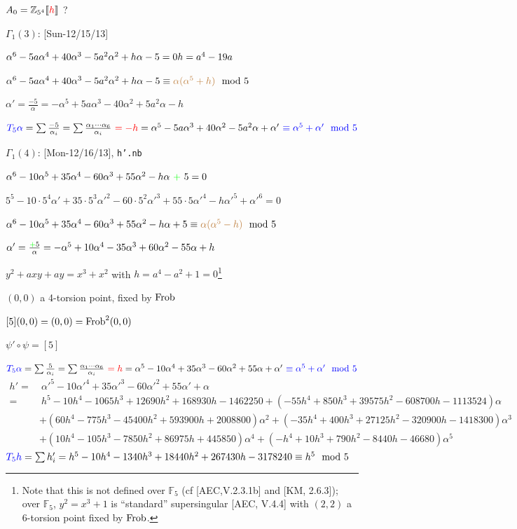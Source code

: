 \documentclass{rs}
\theoremstyle{definition}
\theoremstyle{remark}
\newcommand{\mb}[1]{\mathbb{#1}}
\newcommand{\Frob}{{\rm Frob}}
\newcommand{\BF}{{\mb F}}
\newcommand{\BZ}{{\mb Z}}
\newcommand{\md}{~~{\rm mod}~}
\newcommand{\A}{\alpha}
\newcommand{\G}{\Gamma}
\newcommand{\lb}{\llbracket}
\newcommand{\rb}{\rrbracket}
\renewcommand{\=}{\approx}
\renewcommand{\-}{\sim}
\numberwithin{equation}{section}
\numberwithin{thm}{section}
\begin{document}
$A_0 = \BZ_{5^4} \lb \textcolor{red}{h} \rb$ ?  

$\G_1(3)$: \hfill [Sun-12/15/13] 

$\A^6 - 5 a \A^4 + 40 \A^3 - 5 a^2 \A^2 + h \A - 5 = 0 \hfill h = a^4 - 19 a$ 

$\A^6 - 5 a \A^4 + 40 \A^3 - 5 a^2 \A^2 + h \A - 5 \equiv \textcolor{brown}{\A (\A^5 + h)} \md 5$ 

$\A' = \frac{-5}{\A} = -\A^5 + 5 a \A^3 - 40 \A^2 + 5 a^2 \A - h$ 

$\textcolor{blue}{T_5 \A} = \sum \frac{-5}{\A_i} = \sum \frac{\A_1 \cdots \A_6}{\A_i} 
~\textcolor{red}{= -h} = \A^5 - 5 a \A^3 + 40 \A^2 - 5 a^2 \A + \A' ~\textcolor{blue}{\equiv \A^5 + \A' \md 5}$ 

$\G_1(4)$: \hfill [Mon-12/16/13], \texttt{h'.nb} 

$\A^6 - 10 \A^5 + 35 \A^4 - 60 \A^3 + 55 \A^2 - h \A ~\textcolor{green}{+}~ 5 = 0$ 

\hfill $5^5 - 10 \cdot 5^4 \A' + 35 \cdot 5^3 \A'^2 - 60 \cdot 5^2 \A'^3 + 55 \cdot 5 \A'^4 - h \A'^5 + \A'^6 = 0$ 

$\A^6 - 10 \A^5 + 35 \A^4 - 60 \A^3 + 55 \A^2 - h \A + 5 \equiv \textcolor{brown}{\A (\A^5 - h)} \md 5$ 

$\A' = \frac{\textcolor{green}{+}5}{\A} = -\A^5 + 10 \A^4 - 35 \A^3 + 60 \A^2 - 55 \A + h$ 

\hfill $y^2 + a x y + a y = x^3 + x^2$ with $h = a^4 - a^2 + 1 = 0$\footnote{Note that this is not defined over $\BF_5$ (cf [AEC,V.2.3.1b] and [KM, 2.6.3]); 
over $\BF_5$, $y^2 = x^3 + 1$ is ``standard'' supersingular [AEC, V.4.4] with $(2,2)$ a 6-torsion point fixed by $\Frob$.  } 

\hfill $(0,0)$ a 4-torsion point, fixed by $\Frob$ 

\hfill $[5](0,0) = (0,0) = \Frob^2(0,0)$ 

\hfill $\psi' \circ \psi = [5]$ 

$\textcolor{blue}{T_5 \A} = \sum \frac{5}{\A_i} = \sum \frac{\A_1 \cdots \A_6}{\A_i} 
~\textcolor{red}{= h} = \A^5 - 10 \A^4 + 35 \A^3 - 60 \A^2 + 55 \A + \A' ~\textcolor{blue}{\equiv \A^5 + \A' \md 5}$ 
\begin{equation*}
\begin{split}
 h' = & ~ \A'^5 - 10 \A'^4 + 35 \A'^3 - 60 \A'^2 + 55 \A' + \A \\
    = & ~ h^5 - 10 h^4 - 1065 h^3 + 12690 h^2 + 168930 h - 1462250 + (-55 h^4 + 850 h^3 + 39575 h^2 - 608700 h - 1113524) \A \\
      & + (60 h^4 - 775 h^3 - 45400 h^2 + 593900 h + 2008800) \A^2 + (-35 h^4 + 400 h^3 + 27125 h^2 - 320900 h - 1418300) \A^3 \\
      & + (10 h^4 - 105 h^3 - 7850 h^2 + 86975 h + 445850) \A^4 + (-h^4 + 10 h^3 + 790 h^2 - 8440 h - 46680) \A^5 
\end{split}
\end{equation*}
$\textcolor{blue}{T_5 h} = \sum h_i' = h^5 - 10 h^4 - 1340 h^3 + 18440 h^2 + 267430 h - 3178240 \equiv h^5 \md 5$ 
\end{document}

